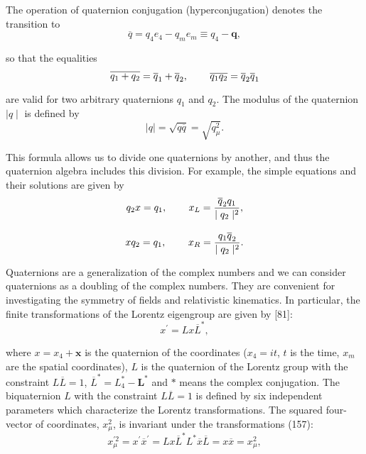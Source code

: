 \documentclass[a4paper,12pt]{article}
\begin{document}
The operation of quaternion conjugation (hyperconjugation) denotes
the transition to
\begin{equation}
\overline{q}=q_4e_4-q_me_m\equiv q_4-\mathbf{q},  \label{153}
\end{equation}

so that the equalities
\begin{equation}
\overline{q_1+q_2}=\overline{q}_1+\overline{q}_2,\hspace{0.3in}
\overline{q_1q_2}=\overline{q}_2\overline{q}_1  \label{154}
\end{equation}

are valid for two arbitrary quaternions $q_1$ and $q_2$. The
modulus of the quaternion $\mid q\mid $ is defined by
\begin{equation}
\mid q\mid =\sqrt{q\overline{q}}=\sqrt{q_\mu ^2}.  \label{155}
\end{equation}

This formula allows us to divide one quaternions by another, and thus the
quaternion algebra includes this division. For example, the simple equations
and their solutions are given by
\[
q_2x=q_1,\hspace{0.3in}x_L=\frac{\overline{q}_2q_1}{\mid q_2\mid ^2},
\]
\vspace{-8mm}
\begin{equation}  \label{156}
\end{equation}
\vspace{-8mm}
\[
xq_2=q_1,\hspace{0.3in}x_R=\frac{q_1\overline{q}_2}{\mid q_2\mid
^2}.
\]

Quaternions are a generalization of the complex numbers and we can
consider quaternions as a doubling of the complex numbers. They
are convenient for investigating the symmetry of fields and
relativistic kinematics. In particular, the finite transformations
of the Lorentz eigengroup are given by [81]:
\begin{equation}
x^{\prime }=Lx\overline{L}^{*},  \label{157}
\end{equation}

where $x=x_4+\mathbf{x}$ is the quaternion of the coordinates
($x_4=it$, $t$ is the time, $x_m$ are the spatial coordinates),
$L$ is the quaternion of the Lorentz group with the constraint
$L\overline{L}=1$, $\overline{L} ^{*}=L_4^{*}-\mathbf{L}^{*}$ and
$*$ means the complex conjugation. The biquaternion $L$ with the
constraint $L\overline{L}=1$ is defined by six independent
parameters which characterize the Lorentz transformations. The
squared four-vector of coordinates, $x_\mu ^2$, is invariant under
the transformations (157):
\begin{equation}
x_\mu ^{\prime 2}=x^{\prime }\overline{x}^{\prime
}=Lx\overline{L}^{*}L^{*}
\overline{x}\overline{L}=x\overline{x}=x_\mu ^2,  \label{158}
\end{equation}
\end{document}
